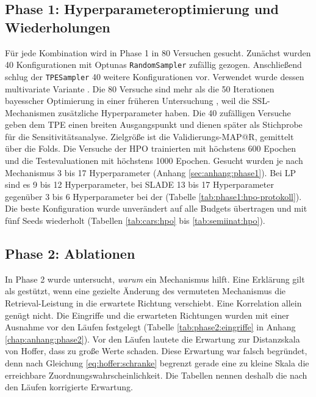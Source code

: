 \subsection{Phase 1: Hyperparameteroptimierung und Wiederholungen}
\label{sec:m:phase1}
 Für jede Kombination wird in Phase 1 in 80 Versuchen gesucht. Zunächst wurden 40 Konfigurationen mit Optunas \texttt{RandomSampler} zufällig gezogen. Anschließend schlug der \texttt{TPESampler} 40 weitere Konfigurationen vor. Verwendet wurde dessen multivariate Variante \cite{watanabe_tree-structured_2023}. Die 80 Versuche sind mehr als die 50 Iterationen bayesscher Optimierung in einer früheren Untersuchung \cite{musgrave_metric_2020}, weil die \ac{SSL}-Mechanismen zusätzliche Hyperparameter haben. Die 40 zufälligen Versuche geben dem \ac{TPE} einen breiten Ausgangspunkt und dienen später als Stichprobe für die Sensitivitätsanalyse. Zielgröße ist die Validierungs-\ac{MAP@R}, gemittelt über die Folds. Die Versuche der \ac{HPO} trainierten mit höchstens 600 Epochen und die Testevaluationen mit höchstens \num{1000} Epochen. Gesucht wurden je nach Mechanismus 3 bis 17 Hyperparameter (Anhang \ref{sec:anhang:phase1}). Bei \ac{LP} sind es 9 bis 12 Hyperparameter, bei \ac{SLADE} 13 bis 17 Hyperparameter gegenüber 3 bis 6 Hyperparameter bei der \UEBL (Tabelle \ref{tab:phase1:hpo-protokoll}). Die beste Konfiguration wurde unverändert auf alle Budgets übertragen und mit fünf Seeds wiederholt (Tabellen \ref{tab:cars:hpo} bis \ref{tab:semiinat:hpo}). 

\subsection{Phase 2: Ablationen}
\label{sec:m:phase2}

In Phase 2 wurde untersucht, \emph{warum} ein Mechanismus hilft. Eine Erklärung gilt als gestützt, wenn eine gezielte Änderung des vermuteten Mechanismus die Retrieval-Leistung in die erwartete Richtung verschiebt. Eine Korrelation allein genügt nicht. Die Eingriffe und die erwarteten Richtungen wurden mit einer Ausnahme vor den Läufen festgelegt (Tabelle \ref{tab:phase2:eingriffe} in Anhang \ref{chap:anhang:phase2}). Vor den Läufen lautete die Erwartung zur Distanzskala von Hoffer, dass zu große Werte schaden. Diese Erwartung war falsch begründet, denn nach Gleichung \eqref{eq:hoffer:schranke} begrenzt gerade eine zu kleine Skala die erreichbare Zuordnungswahrscheinlichkeit. Die Tabellen nennen deshalb die nach den Läufen korrigierte Erwartung.

